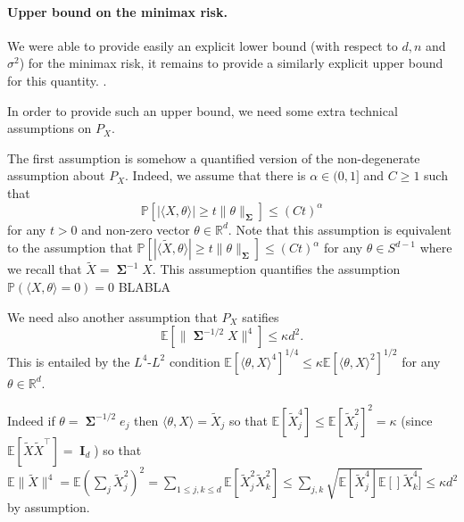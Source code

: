 \documentclass[
	fontsize=11pt, %
	twoside=false, %
	numbers=noenddot, %
]{kaobook}
\DeclareMathOperator{\bI}{{\boldsymbol I}}
\DeclareMathOperator{\bSigma}{\boldsymbol \Sigma}
\renewcommand{\P}{\mathbb P}
\newcommand{\E}{\mathbb E}
\newcommand{\R}{\mathbb R}
\newcommand{\wt}{\widetilde}
\newcommand{\norm}[1]{\| #1 \|}
\newcommand{\inr}[1]{\langle #1 \rangle}
\begin{document}
\paragraph{Upper bound on the minimax risk.} 

We were able to provide easily an explicit lower bound (with respect to $d, n$ and $\sigma^2$) for the minimax risk, it remains to provide a similarly explicit upper bound for this quantity.
.

In order to provide such an upper bound, we need some extra technical assumptions on $P_X$.

The first assumption is somehow a quantified version of the non-degenerate assumption about $P_X$. 
Indeed, we assume that there is $\alpha \in (0, 1]$ and $C \geq 1$ such that
\begin{equation}
	\label{eq:quanti-nondegenerate}
	\P[ |\inr{X, \theta} | \geq t \norm{\theta}_{\bSigma} ] \leq (C t)^\alpha
\end{equation}
for any $t > 0$ and non-zero vector $\theta \in \R^d$. Note that this assumption is equivalent to the assumption that $\P[ |\inr{\tilde X, \theta} | \geq t \norm{\theta}_{\bSigma} ] \leq (C t)^\alpha$ for any $\theta \in S^{d-1}$ where we recall that $\wt X = \bSigma^{-1} X$. 
This assumeption quantifies the assumption $\P(\inr{X, \theta} = 0) = 0$ BLABLA

We need also another assumption that $P_X$ satifies
\begin{equation*}
	\E [\norm{\bSigma^{-1/2} X}^4] \leq \kappa d^2.
\end{equation*}
This is entailed by the $L^4$-$L^2$ condition $\E[\inr{\theta, X}^4]^{1/4} \leq \kappa \E[ \inr{\theta, X}^2]^{1/2}$ for any $\theta \in \R^d$.

Indeed if $\theta = \bSigma^{-1/2} e_j$ then $\inr{\theta, X} = \wt X_j$ so that $\E[\wt X_j^4] \leq \E [\wt X_j^2]^2 = \kappa$ (since $\E[\wt X \wt X^\top] = \bI_d$) so that $\E \norm{\wt X}^4 = \E (\sum_j \wt X_j^2 )^2 = \sum_{1 \leq j, k \leq d} \E[ \wt X_j^2 \wt X_k^2] \leq \sum_{j, k} \sqrt{\E[ \wt X_j^4] \E[] \wt X_k^4]} \leq \kappa d^2$ by assumption. 
\end{document}
